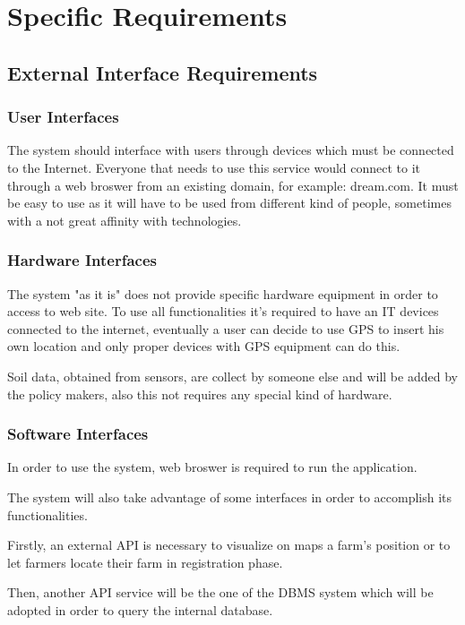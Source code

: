 \documentclass[table, 12pt]{article}
\begin{document}
\section{Specific Requirements}

\subsection{External Interface Requirements}

\subsubsection{User Interfaces}
The system should interface with users through devices which must be connected to the Internet.
Everyone that needs to use this service would connect to it through a web broswer from an existing domain, for example: dream.com.
It must be easy to use as it will have to be used from different kind of people, sometimes with a not great affinity with technologies.

\subsubsection{Hardware Interfaces}
The system "as it is" does not provide specific hardware equipment in order to access to web site. To use all functionalities it's required to have an IT devices connected to the internet, eventually a user can decide to use GPS to insert his own location and only proper devices with GPS equipment can do this. 

Soil data, obtained from sensors, are collect by someone else and will be added by the policy makers, also this not requires any special kind of hardware.

\subsubsection{Software Interfaces}
\label{software_interfaces}
In order to use the system, web broswer is required to run the application.

The system will also take advantage of some interfaces in order to accomplish its functionalities.

Firstly, an external API is necessary to visualize on maps a farm's position or to let farmers locate their farm in registration phase.

Then, another API service will be the one of the DBMS system which will be adopted in order to query the internal database.
\end{document}
